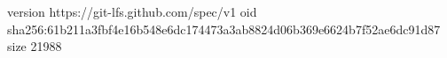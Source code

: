 version https://git-lfs.github.com/spec/v1
oid sha256:61b211a3fbf4e16b548e6dc174473a3ab8824d06b369e6624b7f52ae6dc91d87
size 21988
